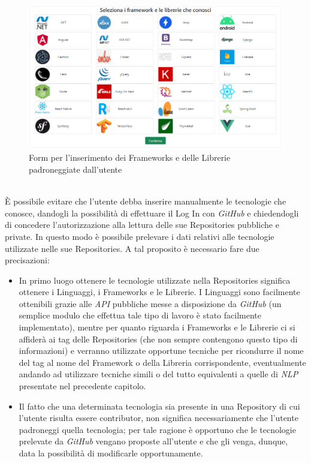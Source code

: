 \begin{figure}[!htb]
    \includegraphics[width=\textwidth]{capitoli/images/frameworks_padroneggiati.png}
    \caption{Form per l'inserimento dei Frameworks e delle Librerie padroneggiate dall'utente}
    \label{fig:frameworks_padroneggiati}
\end{figure}
\\È possibile evitare che l'utente debba inserire manualmente le tecnologie che conosce, dandogli la possibilità di effettuare il Log In con \emph{GitHub} e chiedendogli di concedere l'autorizzazione alla lettura delle sue Repositories pubbliche e private. In questo modo è possibile prelevare i dati relativi alle tecnologie utilizzate nelle sue Repositories. A tal proposito è necessario fare due precisazioni:
\begin{itemize}
    \item In primo luogo ottenere le tecnologie utilizzate nella Repositories significa ottenere i Linguaggi, i Frameworks e le Librerie. I Linguaggi sono facilmente ottenibili grazie alle \emph{API} pubbliche messe a disposizione da \emph{GitHub} (un semplice modulo che effettua tale tipo di lavoro è stato facilmente implementato), mentre per quanto riguarda i Frameworks e le Librerie ci si affiderà ai tag delle Repositories (che non sempre contengono questo tipo di informazioni) e verranno utilizzate opportune tecniche per ricondurre il nome del tag al nome del Framework o della Libreria corrispondente, eventualmente andando ad utilizzare tecniche simili o del tutto equivalenti a quelle di \emph{NLP} presentate nel precedente capitolo.
    \item Il fatto che una determinata tecnologia sia presente in una Repository di cui l'utente risulta essere contributor, non significa necessariamente che l'utente padroneggi quella tecnologia; per tale ragione è opportuno che le tecnologie prelevate da \emph{GitHub} vengano proposte all'utente e che gli venga, dunque, data la possibilità di modificarle opportunamente.
\end{itemize}
